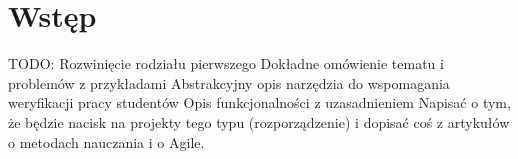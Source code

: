 \chapter{Wstęp}

TODO:
Rozwinięcie rodziału pierwszego
Dokładne omówienie tematu i problemów z przykładami
Abstrakcyjny opis narzędzia do wspomagania weryfikacji pracy studentów
Opis funkcjonalności z uzasadnieniem
Napisać o tym, że będzie nacisk na projekty tego typu (rozporządzenie) i dopisać coś z artykułów o metodach nauczania i o Agile.
